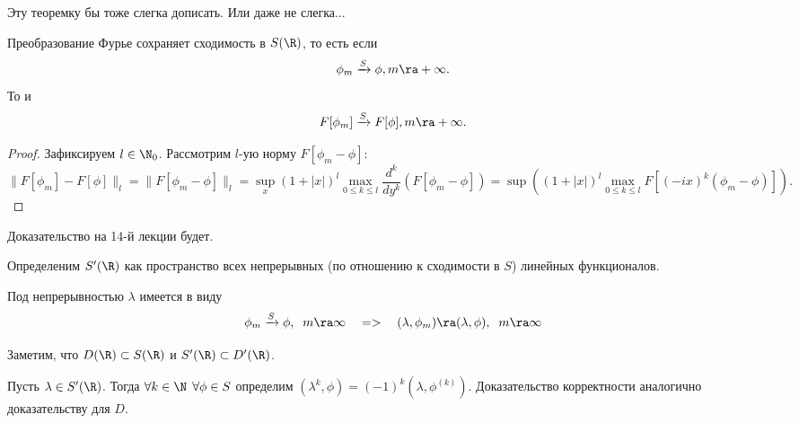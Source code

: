 \begin{note}
    Эту теоремку бы тоже слегка дописать.
    Или даже не слегка...
\end{note}
\begin{theorem}
    Преобразование Фурье сохраняет сходимость в $S(\R)$, то есть если
    \[
        \phi_m \xrightarrow{S} \phi, m \ra +\infty.
    \]
    То и
    \[
        F[\phi_m] \xrightarrow{S} F[\phi], m \ra +\infty.
    \]
\end{theorem}
\begin{proof}
    Зафиксируем $l \in \N_0$.
    Рассмотрим $l$-ую норму $F[\phi_m - \phi]$:
    \[
        \|F[\phi_m] - F[\phi]\|_{l} = \|F[\phi_m - \phi]\|_{l} = \sup \limits_x (1 + |x|)^l \max\limits_{0 \leq k \leq l} \dfrac{d^k}{dy^k}(F[\phi_m - \phi]) = \sup ((1 + |x|)^l \max\limits_{0 \leq k \leq l} F[(-ix)^k(\phi_m - \phi)]).
    \]
\end{proof}
\begin{note}
    Доказательство на 14-й лекции будет.
\end{note}
\begin{definition}
    Определеним $S'(\R)$ как пространство всех непрерывных (по отношению к сходимости в $S$) линейных функционалов.
\end{definition}
\begin{note}
    Под непрерывностью $\lambda$ имеется в виду 
    \[ \phi_m \xrightarrow{S} \phi, \;\; m \ra \infty \quad => \quad (\lambda, \phi_m) \ra (\lambda, \phi), \;\; m \ra \infty
    \]
\end{note}
\begin{note}
    Заметим, что $D(\R) \subset S(\R)$ и $S'(\R) \subset D'(\R)$.
\end{note}
\begin{definition}
    Пусть $\lambda \in S'(\R)$.
    Тогда $\forall k \in \N \;\, \forall \phi \in S$ определим $(\lambda^k, \phi) = (-1)^k (\lambda, \phi^{(k)})$.
    Доказательство корректности аналогично доказательству для $D$.
\end{definition}
